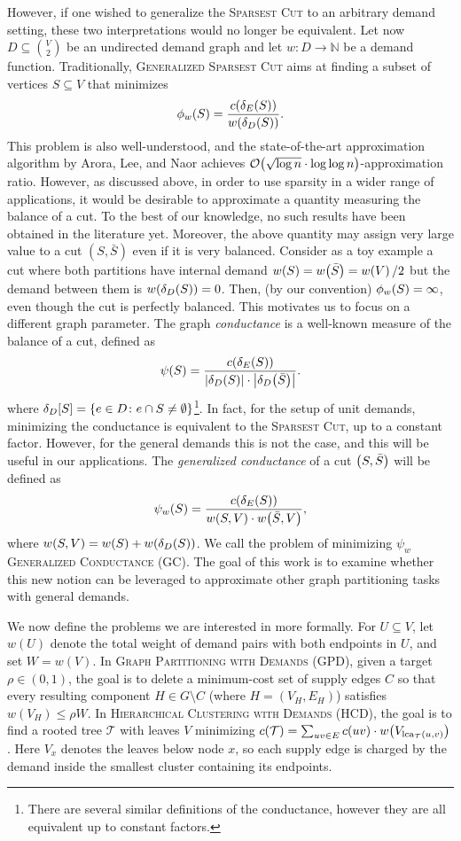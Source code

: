 However, if one wished to generalize the \textsc{Sparsest Cut} to an arbitrary demand setting, these two interpretations would no longer be equivalent. Let now $D\subseteq\binom{V}{2}$ be an undirected demand graph and let $w\colon D\to \mathbb{N}$ be a demand function.
Traditionally, \textsc{Generalized Sparsest Cut} aims at finding a subset of vertices $S\subseteq V$ that minimizes
\[\phi_w\mathopen{}\left( S \right) = \frac{c\mathopen{}\left( \delta_E\mathopen{}\left( S \right) \right)}{w\mathopen{}\left( \delta_D\mathopen{}\left( S \right) \right)}.
\]
This problem is also well-understood, and the state-of-the-art approximation algorithm by Arora, Lee, and Naor \cite{EuclideanDistortionAndTheSparsestCut} achieves $\mathcal{O}\mathopen{}\left( \sqrt{\log n}\cdot \log \log n \right)$-approximation ratio. However, as discussed above, in order to use sparsity in a wider range of applications, it would be desirable to approximate a quantity measuring the balance of a cut.
To the best of our knowledge, no such results have been obtained in the literature yet. Moreover, the above quantity may assign very large value to a cut $(S, \bar{S})$ even if it is very balanced.
Consider as a toy example a cut where both partitions have internal demand $w\mathopen{}\left( S \right)=w\mathopen{}\left( \bar{S} \right)=w\mathopen{}\left( V \right)/2$ but the demand between them is $w\mathopen{}\left( \delta_D\mathopen{}\left( S \right) \right) = 0$. Then, (by our convention) $\phi_w\mathopen{}\left( S \right)=\infty$, even though the cut is perfectly balanced. This motivates us to focus on a different graph parameter.
The graph \emph{conductance} is a well-known measure of the balance of a cut, defined as
\[
\psi\mathopen{}\left( S \right) = \frac{c\mathopen{}\left( \delta_E\mathopen{}\left( S \right) \right)}{\mathopen{}\left| \delta_D\mathopen{}\left( S \right) \right|\cdot \mathopen{}\left| \delta_D\mathopen{}\left( \bar{S} \right) \right|}.
\]
where $\delta_D[S]=\mathopen{}\left\{ e\in D\colon e\cap S\neq \emptyset \right\}$\footnote{There are several similar definitions of the conductance, however they are all equivalent up to constant factors.}. In fact, for the setup of unit demands, minimizing the conductance is equivalent to the \textsc{Sparsest Cut}, up to a constant factor. However, for the general demands this is not the case, and this will be useful in our applications. The \emph{generalized conductance} of a cut $\mathopen{}\left( S,\bar{S} \right)$ will be defined as
\[
\psi_w\mathopen{}\left( S \right) = \frac{c\mathopen{}\left( \delta_E\mathopen{}\left( S \right) \right)}{w\mathopen{}\left( S, V \right)\cdot w\mathopen{}\left( \bar{S}, V \right)},
\]
where $w\mathopen{}\left( S,V \right)=w\mathopen{}\left( S \right)+w\mathopen{}\left( \delta_D\mathopen{}\left( S \right) \right)$.
We call the problem of minimizing $\psi_w$ \textsc{Generalized Conductance} (GC). The goal of this work is to examine whether this new notion can be leveraged to approximate other graph partitioning tasks with general demands.

We now define the problems we are interested in more formally.
For $U\subseteq V$, let $w(U)$ denote the total weight of demand pairs with both endpoints in $U$, and set $W=w(V)$. In \textsc{Graph Partitioning with Demands} (GPD), given a target $\rho\in(0,1)$, the goal is to delete a minimum-cost set of supply edges $C$ so that every resulting component $H\in G\setminus C$ (where $H=(V_H,E_H)$) satisfies $w(V_H)\leq\rho W$. In \textsc{Hierarchical Clustering with Demands} (HCD), the goal is to find a rooted tree $\mathcal T$ with leaves $V$ minimizing $c\mathopen{}\left( \mathcal{T} \right)=\sum_{uv\in E} c(uv)\cdot w\mathopen{}\left( V_{\operatorname{lca}_{\mathcal T}(u,v)} \right)$.
Here $V_x$ denotes the leaves below node $x$, so each supply edge is charged by the demand inside the smallest cluster containing its endpoints.


